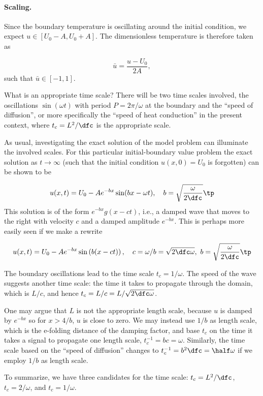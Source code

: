 \documentclass[graybox,envcountchap,sectrefs,final]{svmonodo}
\begin{document}
\paragraph{Scaling.}
Since the boundary temperature is oscillating around the initial
condition, we expect $u\in [U_0-A,U_0+A]$.
The dimensionless temperature is therefore taken as

\[ \bar u = \frac{u-U_0}{2A},\]
such that $\bar u\in [-1,1]$.

What is an appropriate time scale? There will be two time scales involved,
the oscillations $\sin(\omega t)$ with period $P=2\pi/\omega$ at
the boundary and the ``speed of diffusion'', or more specifically
the ``speed of heat conduction'' in the present context,
where $t_c=L^2/\dfc$ is the appropriate scale.

As usual, investigating the exact solution of the model problem can
illuminate the involved scales. For this particular initial-boundary
value problem the exact solution as $t\rightarrow\infty$ (such that
the initial condition $u(x,0)=U_0$ is forgotten) can be shown to be

\begin{equation}
u(x,t) = U_0 - Ae^{-bx}\sin (bx - \omega t),\quad b =\sqrt{\frac{\omega}{2\dfc}}\tp
\label{scale:heat:daynight:sol}
\end{equation}
This solution is of the form $e^{-bx}g(x-ct)$, i.e., a damped wave that
moves to the right with velocity $c$ and a damped amplitude $e^{-bx}$.
This is perhaps more easily seen if we make a rewrite

\[ u(x,t) = U_0 - Ae^{-bx}\sin\left(b(x - ct)\right),\quad
c=\omega/b = \sqrt{2\dfc\omega},\  b =\sqrt{\frac{\omega}{2\dfc}}\tp\]

The boundary oscillations lead to the time scale $t_c=1/\omega$.
The speed of the wave suggests another time scale: the time it
takes to propagate through the domain, which is $L/c$, and
hence $t_c = L/c = L/\sqrt{2\dfc\omega}$.

One may argue that $L$ is not the appropriate length scale, because
$u$ is damped by $e^{-bx}$ so for $x > 4/b$, $u$ is close to zero.
We may instead use $1/b$ as length scale, which is the e-folding distance of the
damping factor, and base
$t_c$ on the time it takes a signal to propagate one length scale,
$t_c^{-1}=bc=\omega$. Similarly, the time scale based on
the ``speed of diffusion'' changes to
$t_c^{-1}= b^2\dfc = \half\omega$ if we employ $1/b$ as length scale.

To summarize, we have three candidates for the time scale:
$t_c=L^2/\dfc$, $t_c=2/\omega$, and $t_c=1/\omega$.
\end{document}
